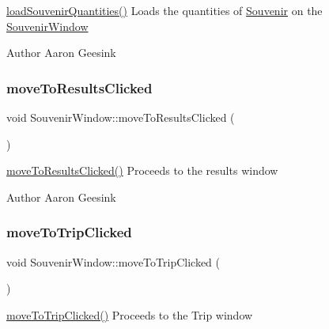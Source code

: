 \mbox{\hyperlink{class_souvenir_window_a1c004a0549aeb3b18269f1330c23168e}{load\+Souvenir\+Quantities()}} Loads the quantities of \mbox{\hyperlink{class_souvenir}{Souvenir}} on the \mbox{\hyperlink{class_souvenir_window}{Souvenir\+Window}} 

\begin{DoxyAuthor}{Author}
Aaron Geesink 
\end{DoxyAuthor}
\mbox{\label{class_souvenir_window_a6528ccd60ed871aa9f5f7dc1fb84b67f}} 
\subsubsection{\texorpdfstring{moveToResultsClicked}{moveToResultsClicked}}
{\footnotesize\ttfamily void Souvenir\+Window\+::move\+To\+Results\+Clicked (\begin{DoxyParamCaption}{ }\end{DoxyParamCaption})\hspace{0.3cm}{\ttfamily [signal]}}



\mbox{\hyperlink{class_souvenir_window_a6528ccd60ed871aa9f5f7dc1fb84b67f}{move\+To\+Results\+Clicked()}} Proceeds to the results window 

\begin{DoxyAuthor}{Author}
Aaron Geesink 
\end{DoxyAuthor}
\mbox{\label{class_souvenir_window_a711717cbb7f22fe11e3778126a0b4577}} 
\subsubsection{\texorpdfstring{moveToTripClicked}{moveToTripClicked}}
{\footnotesize\ttfamily void Souvenir\+Window\+::move\+To\+Trip\+Clicked (\begin{DoxyParamCaption}{ }\end{DoxyParamCaption})\hspace{0.3cm}{\ttfamily [signal]}}



\mbox{\hyperlink{class_souvenir_window_a711717cbb7f22fe11e3778126a0b4577}{move\+To\+Trip\+Clicked()}} Proceeds to the Trip window 

